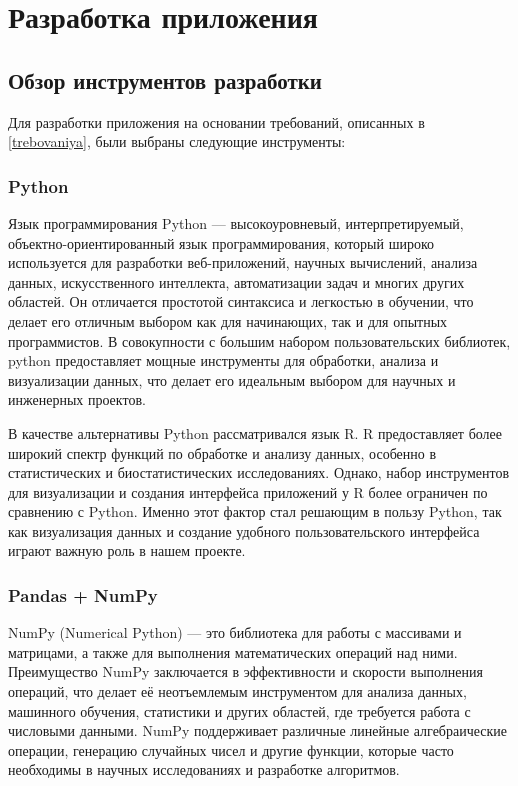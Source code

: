 
\section{Разработка приложения}

\subsection{Обзор инструментов разработки}

Для разработки приложения на основании требований, описанных в \ref{trebovaniya}, были выбраны следующие инструменты:

\subsubsection{Python}

Язык программирования Python --- высокоуровневый, интерпретируемый, объектно-ориентированный язык программирования, который широко используется для разработки веб-приложений, научных вычислений, анализа данных, искусственного интеллекта, автоматизации задач и многих других областей. Он отличается простотой синтаксиса и легкостью в обучении, что делает его отличным выбором как для начинающих, так и для опытных программистов. В совокупности с большим набором пользовательских библиотек, python предоставляет мощные инструменты для обработки, анализа и визуализации данных, что делает его идеальным выбором для научных и инженерных проектов. 

В качестве альтернативы Python рассматривался язык R. R предоставляет более широкий спектр функций по обработке и анализу данных, особенно в статистических и биостатистических исследованиях. Однако, набор инструментов для визуализации и создания интерфейса приложений у R более ограничен по сравнению с Python. Именно этот фактор стал решающим в пользу Python, так как визуализация данных и создание удобного пользовательского интерфейса играют важную роль в нашем проекте.

\subsubsection{Pandas + NumPy}

NumPy (Numerical Python) --- это библиотека для работы с массивами и матрицами, а также для выполнения математических операций над ними. Преимущество NumPy заключается в эффективности и скорости выполнения операций, что делает её неотъемлемым инструментом для анализа данных, машинного обучения, статистики и других областей, где требуется работа с числовыми данными. NumPy поддерживает различные линейные алгебраические операции, генерацию случайных чисел и другие функции, которые часто необходимы в научных исследованиях и разработке алгоритмов.

